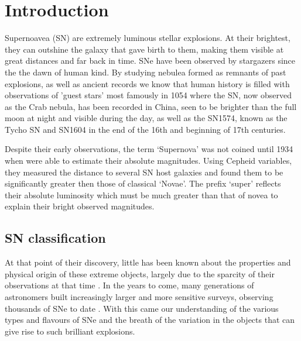 \chapter{Introduction}  \label{Chapter1}

Supernoavea (SN) are extremely luminous stellar explosions. At their brightest, they can outshine the galaxy that gave birth to them, making them visible at great distances and far back in time. SNe have been observed by stargazers since the the dawn of human kind. By studying nebulea formed as remnants of past explosions, as well as ancient records we know that human history is filled with observations of 'guest stars' most famously in 1054 where the SN, now observed as the Crab nebula, has been recorded in China, seen to be brighter than the full moon at night and visible during the day, as well as the SN1574, known as the Tycho SN and SN1604 in the end of the 16th and beginning of 17th centuries.

Despite their early observations, the term `Supernova' was not coined until 1934 when \citet{Baade1934} were able to estimate their absolute magnitudes. Using Cepheid variables, they measured the distance to several SN host galaxies and found them to be significantly greater then those of classical `Novae'. The prefix `super' reflects their absolute luminosity which must be much greater than that of novea to explain their bright observed magnitudes.

\section{SN classification}
At that point of their discovery, little has been known about the properties and physical origin of these extreme objects, largely due to the sparcity of their observations at that time \citep{Zwicky1938}. In the years to come, many generations of astronomers built increasingly larger and more sensitive surveys, observing thousands of SNe to date \citep{Alsabti2017}. With this came our understanding of the various types and flavours of SNe and the breath of the variation in the objects that can give rise to such brilliant explosions.

